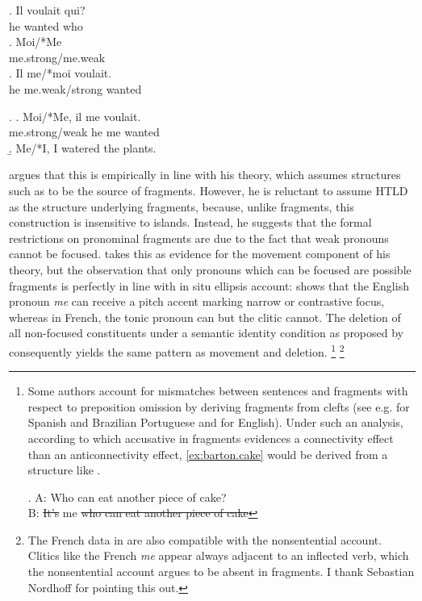 \exg. Il voulait qui?\\
he wanted who\\
\hfill {}
\ag. Moi/*Me\\
me.strong/me.weak\\
\bg. Il me/*moi voulait.\\  
he me.weak/strong wanted\\

\ex. \ag. Moi/*Me, il me voulait.\\
me.strong/weak he me wanted\\
\hfill {}
\b. Me/*I, I watered the plants. \hfill \citep[703]{merchant2004}

\citeauthor{merchant2004} argues that this is empirically in line with his theory, which assumes structures such as \Last to be the source of fragments. However, he is reluctant to assume HTLD as the structure underlying fragments, because, unlike fragments, this construction is insensitive to islands. Instead, he suggests that the formal restrictions on pronominal fragments are due to the fact that weak pronouns cannot be focused. \citet{merchant2004} takes this as evidence for the movement component of his theory, but the observation that only pronouns which can be focused are possible fragments is perfectly in line with  in situ ellipsis account: \Next[a] shows that the English pronoun \textit{me} can receive a pitch accent marking narrow or contrastive focus, whereas in French, the tonic pronoun \Next[b] can but the clitic \Next[c] cannot. The deletion of all non-focused constituents under a semantic identity condition as proposed by \citet{reich2007} consequently yields the same pattern as movement and deletion.%
%
\footnote{Some authors account for mismatches between sentences and fragments with respect to preposition omission by deriving fragments from clefts (see e.g. \citet{rodrigues.etal2009} for Spanish and Brazilian Portuguese and \citet{vancraenenbroeck2010} for English). Under such an analysis, according to which accusative in fragments evidences a connectivity effect than an anticonnectivity effect, \ref{ex:barton.cake} would be derived from a structure like \Next.

\ex. A: Who can eat another piece of cake?\\
     B: \sout{It's} me \sout{who can eat another piece of cake}

}\afterfn%
%
\footnote{The French data in \TextNext are also compatible with the nonsentential account. Clitics like the French \textit{me} appear always adjacent to an inflected verb, which the nonsentential account argues to be absent in fragments. I thank Sebastian Nordhoff for pointing this out.}\afterfn%

